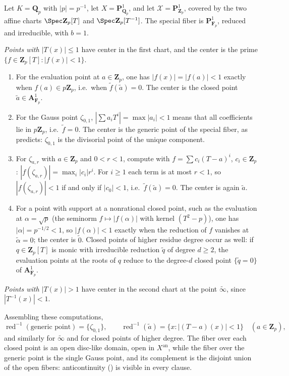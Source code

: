 \begin{example}
\label{ex:berk-reduction-p1-qp}
Let $K=\mathbf Q_p$ with $|p|=p^{-1}$, let
$X=\mathbf P^1_{\mathbf Q_p}$, and let
$\mathcal X=\mathbf P^1_{\mathbf Z_p}$, covered by the two affine
charts $\Spec\mathbf Z_p[T]$ and $\Spec\mathbf Z_p[T^{-1}]$.  The
special fiber is $\mathbf P^1_{\mathbf F_p}$, reduced and irreducible,
with $b=1$.

\emph{Points with $|T(x)|\leq1$} have center in the first chart, and
the center is the prime $\{f\in\mathbf Z_p[T]:|f(x)|<1\}$.
\begin{enumerate}
\item For the evaluation point at $a\in\mathbf Z_p$, one has
  $|f(x)|=|f(a)|<1$ exactly when $f(a)\in p\mathbf Z_p$, i.e.\ when
  $\tilde f(\tilde a)=0$.  The center is the closed point
  $\tilde a\in\mathbf A^1_{\mathbf F_p}$.
\item For the Gauss point $\zeta_{0,1}$,
  $|\sum a_iT^i|=\max|a_i|<1$ means that all coefficients lie in
  $p\mathbf Z_p$, i.e.\ $\tilde f=0$.  The center is the generic
  point of the special fiber, as
   predicts: $\zeta_{0,1}$ is the
  divisorial point of the unique component.
\item For $\zeta_{a,r}$ with $a\in\mathbf Z_p$ and $0<r<1$,
  compute with $f=\sum c_i(T-a)^i$, $c_i\in\mathbf Z_p$:
  $|f(\zeta_{a,r})|=\max_i|c_i|r^i$.  For $i\ge1$ each term is at
  most $r<1$, so $|f(\zeta_{a,r})|<1$ if and only if $|c_0|<1$,
  i.e.\ $\tilde f(\tilde a)=0$.  The center is again $\tilde a$.
\item For a point with support at a nonrational closed point, such as the
  evaluation at $\alpha=\sqrt p$ (the seminorm
  $f\mapsto|f(\alpha)|$ with kernel $(T^2-p)$), one has
  $|\alpha|=p^{-1/2}<1$, so $|f(\alpha)|<1$ exactly when the reduction
  of $f$ vanishes at $\tilde\alpha=0$; the center is
  $\tilde 0$.  Closed points of higher residue degree occur as well:
  if $q\in\mathbf Z_p[T]$ is monic with irreducible reduction
  $\tilde q$ of degree $d\ge2$, the evaluation points at the roots
  of $q$ reduce to the degree-$d$ closed point $\{\tilde q=0\}$
  of $\mathbf A^1_{\mathbf F_p}$.
\end{enumerate}
\emph{Points with $|T(x)|>1$} have center in the second chart at the
point $\widetilde\infty$, since $|T^{-1}(x)|<1$.

Assembling these computations,
\[
 \operatorname{red}^{-1}(\text{generic point})=\{\zeta_{0,1}\},
 \qquad
 \operatorname{red}^{-1}(\tilde a)
 =\{x:|(T-a)(x)|<1\}
 \quad(a\in\mathbf Z_p),
\]
and similarly for $\widetilde\infty$ and for closed points of higher
degree.  The fiber over each closed point is an open disc-like domain,
open in $X^{\mathrm{an}}$, while the fiber over the generic point is the
single Gauss point, and its complement is the disjoint union of the open
fibers: anticontinuity () is
visible in every clause.
\end{example}

